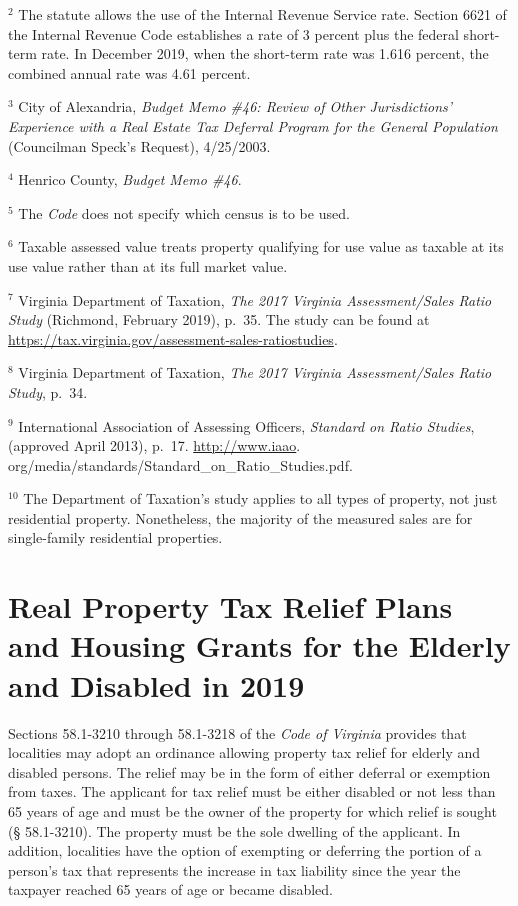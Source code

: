 \documentclass[
]{book}
\begin{document}
\(^2\) The statute allows the use of the Internal Revenue Service rate. Section 6621 of the Internal Revenue Code establishes a rate of 3 percent plus the federal short-term rate. In December 2019, when the short-term rate was 1.616 percent, the combined annual rate was 4.61 percent.

\(^3\) City of Alexandria, \emph{Budget Memo \#46: Review of Other Jurisdictions' Experience with a Real Estate Tax Deferral Program for the General Population} (Councilman Speck's Request), 4/25/2003.

\(^4\) Henrico County, \emph{Budget Memo \#46}.

\(^5\) The \emph{Code} does not specify which census is to be used.

\(^6\) Taxable assessed value treats property qualifying for use value
as taxable at its use value rather than at its full market value.

\(^7\) Virginia Department of Taxation, \emph{The 2017 Virginia Assessment/Sales Ratio Study} (Richmond, February 2019), p.~35. The study
can be found at \url{https://tax.virginia.gov/assessment-sales-ratiostudies}.

\(^8\) Virginia Department of Taxation, \emph{The 2017 Virginia Assessment/Sales Ratio Study}, p.~34.

\(^9\) International Association of Assessing Officers, \emph{Standard on Ratio Studies}, (approved April 2013), p.~17. \url{http://www.iaao}.
org/media/standards/Standard\_on\_Ratio\_Studies.pdf.

\(^10\) The Department of Taxation's study applies to all types of property, not just residential property. Nonetheless, the majority of
the measured sales are for single-family residential properties.

\hypertarget{real-property-tax-relief-plans-and-housing-grants-for-the-elderly-and-disabled-in-2019}{%
\chapter{Real Property Tax Relief Plans and Housing Grants for the Elderly and Disabled in 2019}\label{real-property-tax-relief-plans-and-housing-grants-for-the-elderly-and-disabled-in-2019}}

Sections 58.1-3210 through 58.1-3218 of the \emph{Code of Virginia} provides that localities may adopt an ordinance allowing property tax relief for elderly and disabled persons. The relief may be in the form of either deferral or exemption from taxes. The applicant for tax relief must be either disabled or not less than 65 years of age and must be the owner of the property for which relief is sought (§ 58.1-3210). The property must be the sole dwelling of the applicant. In addition, localities have the option of exempting or deferring the portion of a person's tax that represents the increase in tax liability since the year the taxpayer reached 65 years of age or became disabled.
\end{document}
